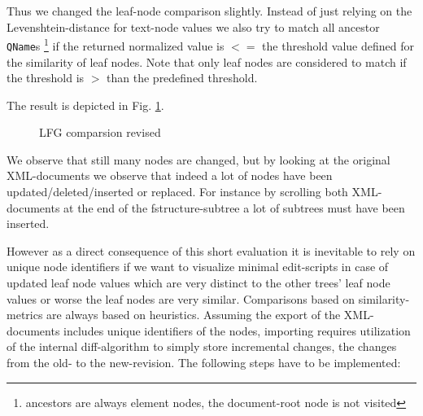 Thus we changed the leaf-node comparison slightly. Instead of just relying on the Levenshtein-distance for text-node values we also try to match all ancestor \texttt{QName}s \footnote{ancestors are always element nodes, the document-root node is not visited} if the returned normalized value is $<=$ the threshold value defined for the similarity of leaf nodes. Note that only leaf nodes are considered to match if the threshold is $>$ than the predefined threshold.

The result is depicted in Fig. \ref{fig:linguistics}.

\begin{figure}[tb]
\caption{\label{fig:linguistics} LFG comparsion revised}
\end{figure}

We observe that still many nodes are changed, but by looking at the original XML-documents we observe that indeed a lot of nodes have been updated/deleted/inserted or replaced. For instance by scrolling both XML-documents at the end of the fstructure-subtree a lot of subtrees must have been inserted.

However as a direct consequence of this short evaluation it is inevitable to rely on unique node identifiers if we want to visualize minimal edit-scripts in case of updated leaf node values which are very distinct to the other trees' leaf node values or worse the leaf nodes are very similar. Comparisons based on similarity-metrics are always based on heuristics. Assuming the export of the XML-documents includes unique identifiers of the nodes, importing requires utilization of the internal diff-algorithm to simply store incremental changes, the changes from the old- to the new-revision. The following steps have to be implemented:

